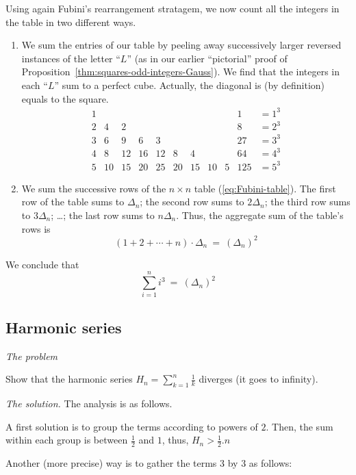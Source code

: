 Using again Fubini's rearrangement stratagem, we now count all the integers in
the table in two different ways.
\begin{enumerate}
\item
We sum the entries of our table by peeling away successively larger
reversed instances of the letter ``$L$'' (as in our earlier
``pictorial'' proof of
Proposition~\ref{thm:squares-odd-integers-Gauss}).  We find that the
integers in each ``$L$'' sum to a perfect cube.
Actually, the diagonal is (by definition) equals to the square.
\[
\begin{array}{rrrrrrrrr|rrc}
1  &    &    &    &    &   &     &    &   & 1   & = 1^3 \\
2  &  4 &  2 &    &    &   &     &    &   & 8   & = 2^3 \\
3  &  6 &  9 &  6 &  3 &   &     &    &   & 27  & = 3^3 \\
4  &  8 & 12 & 16 & 12 &  8 &  4 &    &   & 64  & = 4^3 \\
5  & 10 & 15 & 20 & 25 & 20 & 15 & 10 & 5 & 125 & = 5^3
\end{array}
\]

\item
We sum the successive rows of the $n \times n$ table (\ref{eq:Fubini-table}).  
The first row of the table sums to $\Delta_n$; the second row sums to $2
\Delta_n$; the third row sums to $3 \Delta_n$; \ldots; the last row sums
to $n \Delta_n$.  
Thus, the aggregate sum of the table's rows is 
\[ (1 + 2 + \cdots + n) \cdot \Delta_n \ = \ \left(\Delta_n \right)^2 \]
\end{enumerate}
We conclude that
\[
\sum_{i=1}^n i^3 \ = \  \left(\Delta_n \right)^2
\]



\subsection{Harmonic series}

\noindent \textit{The problem}

Show that the harmonic series $H_n =  \sum_{k=1}^{n} \frac{1}{k}$ diverges (it goes to infinity).
\medskip

\noindent \textit{The solution.}
The analysis is as follows.

A first solution is to group the terms according to powers of $2$. 
Then, the sum within each group is between $\frac{1}{2}$ and $1$, thus,
$H_n > \frac{1}{2}.n$
\medskip

Another (more precise) way is to gather the terms 3 by 3 as follows:

